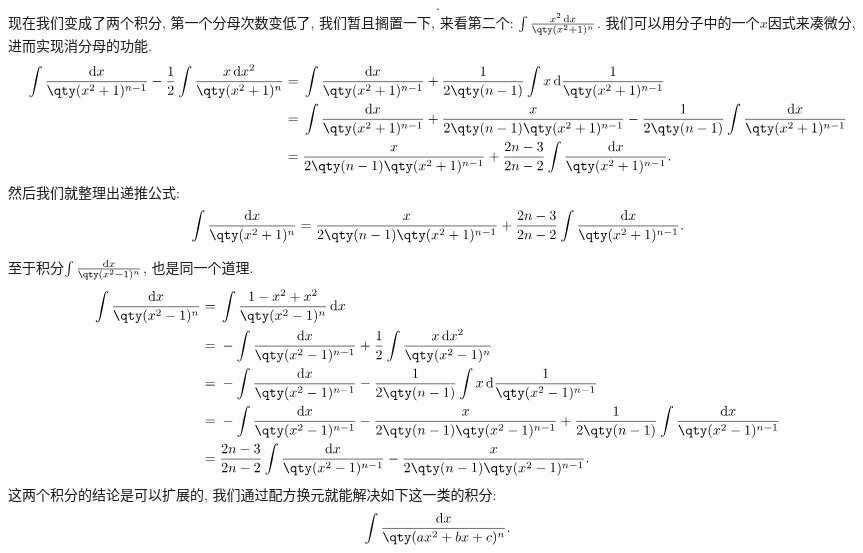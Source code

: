 \documentclass{ctexbook}
\newcommand*{\dif}{\mathop{}\!\mathrm{d}}
\begin{document}
{\begin{align*}
.\end{align*}
现在我们变成了两个积分, 第一个分母次数变低了, 我们暂且搁置一下, 来看第二个: $\int\frac{x^{2}\dif{x}}{\qty(x^{2}+1)^{n}}$. 我们可以用分子中的一个$x$因式来凑微分, 进而实现消分母的功能. 
\begin{align*}
\int\frac{\dif{x}}{\qty(x^{2}+1)^{n-1}}-\frac{1}{2}\int\frac{x\dif{x^{2}}}{\qty(x^{2}+1)^{n}}={}&\int\frac{\dif{x}}{\qty(x^{2}+1)^{n-1}}+\frac{1}{2\qty(n-1)}\int x\dif{\frac{1}{\qty(x^{2}+1)^{n-1}}}\\
={}&\int\frac{\dif{x}}{\qty(x^{2}+1)^{n-1}}+\frac{x}{2\qty(n-1)\qty(x^{2}+1)^{n-1}}-\frac{1}{2\qty(n-1)}\int\frac{\dif{x}}{\qty(x^{2}+1)^{n-1}}\\
={}&\frac{x}{2\qty(n-1)\qty(x^{2}+1)^{n-1}}+\frac{2n-3}{2n-2}\int\frac{\dif{x}}{\qty(x^{2}+1)^{n-1}}
.\end{align*}
然后我们就整理出递推公式: 
\begin{align*}
\int\frac{\dif{x}}{\qty(x^{2}+1)^{n}}=\frac{x}{2\qty(n-1)\qty(x^{2}+1)^{n-1}}+\frac{2n-3}{2n-2}\int\frac{\dif{x}}{\qty(x^{2}+1)^{n-1}}
.\end{align*}\par
至于积分$\int\frac{\dif{x}}{\qty(x^{2}-1)^{n}}$, 也是同一个道理. 
\begin{align*}
\int\frac{\dif{x}}{\qty(x^{2}-1)^{n}}={}&\int\frac{1-x^{2}+x^{2}}{\qty(x^{2}-1)^{n}}\dif{x}\\
={}&-\int\frac{\dif{x}}{\qty(x^{2}-1)^{n-1}}+\frac{1}{2}\int\frac{x\dif{x^{2}}}{\qty(x^{2}-1)^{n}}\\
={}&-\int\frac{\dif{x}}{\qty(x^{2}-1)^{n-1}}-\frac{1}{2\qty(n-1)}\int x\dif{\frac{1}{\qty(x^{2}-1)^{n-1}}}\\
={}&-\int\frac{\dif{x}}{\qty(x^{2}-1)^{n-1}}-\frac{x}{2\qty(n-1)\qty(x^{2}-1)^{n-1}}+\frac{1}{2\qty(n-1)}\int\frac{\dif{x}}{\qty(x^{2}-1)^{n-1}}\\
={}&\frac{2n-3}{2n-2}\int\frac{\dif{x}}{\qty(x^{2}-1)^{n-1}}-\frac{x}{2\qty(n-1)\qty(x^{2}-1)^{n-1}}
.\end{align*}
这两个积分的结论是可以扩展的, 我们通过配方换元就能解决如下这一类的积分: 
\begin{align*}
\int\frac{\dif{x}}{\qty(ax^{2}+bx+c)^{n}}
.\end{align*}
}
\end{document}
